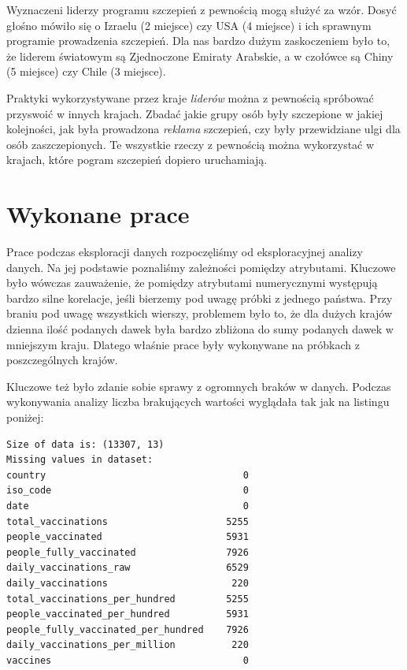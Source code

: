 \documentclass[12pt, oneside]{article}
\begin{document}
Wyznaczeni liderzy programu szczepień z pewnością mogą służyć za wzór. Dosyć głośno mówiło się o Izraelu (2 miejsce) czy USA (4 miejsce) i ich sprawnym programie prowadzenia szczepień. Dla nas bardzo dużym zaskoczeniem było to, że liderem światowym są Zjednoczone Emiraty Arabskie, a w czołówce są Chiny (5 miejsce) czy Chile (3 miejsce). 

Praktyki wykorzystywane przez kraje \textit{liderów} można z pewnością spróbować przyswoić w innych krajach. Zbadać jakie grupy osób były szczepione w jakiej kolejności, jak była prowadzona \textit{reklama} szczepień, czy były przewidziane ulgi dla osób zaszczepionych. Te wszystkie rzeczy z pewnością można wykorzystać w krajach, które pogram szczepień dopiero uruchamiają. 


\section{Wykonane prace}

Prace podczas eksploracji danych rozpoczęliśmy od eksploracyjnej analizy danych. Na jej podstawie poznaliśmy zależności pomiędzy atrybutami. Kluczowe było wówczas zauważenie, że pomiędzy atrybutami numerycznymi występują bardzo silne korelacje, jeśli bierzemy pod uwagę próbki z jednego państwa. Przy braniu pod uwagę wszystkich wierszy, problemem było to, że dla dużych krajów dzienna ilość podanych dawek była bardzo zbliżona do sumy podanych dawek w mniejszym kraju. Dlatego właśnie prace były wykonywane na próbkach z poszczególnych krajów. 

\newpage

Kluczowe też było zdanie sobie sprawy z ogromnych braków w danych. Podczas wykonywania analizy liczba brakujących wartości wyglądała tak jak na listingu poniżej:

\begin{verbatim}
Size of data is: (13307, 13)
Missing values in dataset: 
country                                   0
iso_code                                  0
date                                      0
total_vaccinations                     5255
people_vaccinated                      5931
people_fully_vaccinated                7926
daily_vaccinations_raw                 6529
daily_vaccinations                      220
total_vaccinations_per_hundred         5255
people_vaccinated_per_hundred          5931
people_fully_vaccinated_per_hundred    7926
daily_vaccinations_per_million          220
vaccines                                  0
\end{verbatim}
\end{document}
